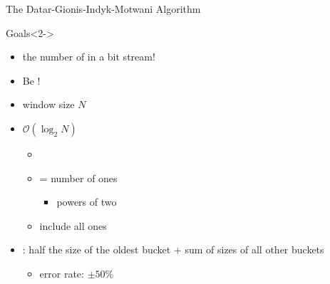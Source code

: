 \begin{frame}{The Datar-Gionis-Indyk-Motwani Algorithm}
	\begin{block}{Goals}<2->
		\begin{itemize}
			\item<3->
			 the number of  in a bit stream!

			\item<4->
			Be !
		\end{itemize}
	\end{block}
	\begin{itemize}
		\item<5->
		window size $N$

		\item<6->
		$\mathcal{O}(\log_2 N)$ 
		\begin{itemize}
			\item<8->

			\item<9->
			 = number of ones
			\begin{itemize}
				\item<10->
				powers of two
%
			\end{itemize}

			\item<11->
			include all ones
		\end{itemize}
	
		\item<12->
		: half the size of the oldest bucket + sum of sizes of all other buckets
		\begin{itemize}
			\item<15->
			error rate: $\pm50\%$
		\end{itemize}
	

\end{itemize}
\end{frame}
